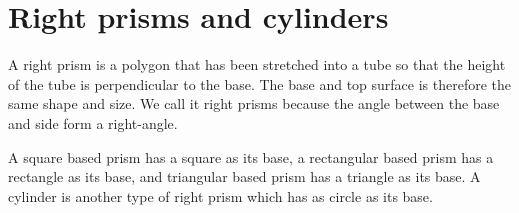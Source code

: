 \section{Right prisms and cylinders }

A right prism is a polygon that has been stretched into a tube so that the height of the tube is
perpendicular to the base. The base and top surface is therefore the same shape and size. We
call it right prisms because the angle between the base and side form a right-angle.
\par
A square based prism has a square as its base, a rectangular based prism has a rectangle as its
base, and triangular based prism has a triangle as its base. A cylinder is another type of right
prism which has as circle as its base.
\par 

